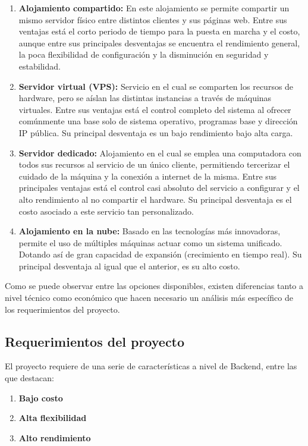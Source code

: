 \begin{enumerate}
	\item \textbf{Alojamiento compartido:}
	En este alojamiento se permite compartir un mismo servidor físico entre distintos clientes y sus páginas web. Entre sus ventajas está el corto periodo de tiempo para la puesta en marcha y el costo, aunque entre sus principales desventajas se encuentra el rendimiento general, la poca flexibilidad de configuración y la disminución en seguridad y estabilidad.
	\item \textbf{Servidor virtual (VPS):}
	Servicio en el cual se comparten los recursos de hardware, pero se aíslan las distintas instancias a través de máquinas virtuales. Entre sus ventajas está el control completo del sistema al ofrecer comúnmente una base solo de sistema operativo, programas base y dirección IP pública. Su principal desventaja es un bajo rendimiento bajo alta carga.
	\item \textbf{Servidor dedicado:}
	Alojamiento en el cual se emplea una computadora con todos sus recursos al servicio de un único cliente, permitiendo tercerizar el cuidado de la máquina y la conexión a internet de la misma. Entre sus principales ventajas está el control casi absoluto del servicio a configurar y el alto rendimiento al no compartir el hardware. Su principal desventaja es el costo asociado a este servicio tan personalizado.
	\item \textbf{Alojamiento en la nube:}
	Basado en las tecnologías más innovadoras, permite el uso de múltiples máquinas actuar como un sistema unificado. Dotando así de gran capacidad de expansión (crecimiento en tiempo real). Su principal desventaja al igual que el anterior, es su alto costo.
\end{enumerate}

Como se puede observar entre las opciones disponibles, existen diferencias tanto a nivel técnico como económico que hacen necesario un análisis más específico de los requerimientos del proyecto.

\subsection{Requerimientos del proyecto}

El proyecto requiere de una serie de características a nivel de Backend, entre las que destacan:


\begin{enumerate}[]\centering
	\item \textbf{Bajo costo}
	\item \textbf{Alta flexibilidad}
	\item \textbf{Alto rendimiento}
\end{enumerate}


